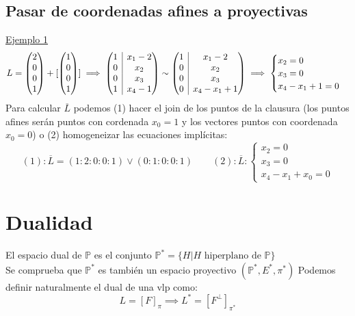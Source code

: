 \documentclass{myclass}
\renewcommand{\P}{\mathbb{P}}
\begin{document}
\subsection{Pasar de coordenadas afines a proyectivas}
\underline{Ejemplo 1} \\
\[
  L = \begin{pmatrix} 2 \\ 0\\0\\1 \end{pmatrix} + [\begin{pmatrix} 1\\0\\0\\1 \end{pmatrix} ] \implies \left(\begin{array}{@{}c|c@{}} 1 & x_1-2 \\ 0 & x_2 \\ 0 & x_3 \\ 1 & x_4-1 \end{array}  \right) \sim \left(\begin{array}{@{}c|c@{}} 1 & x_1-2 \\ 0 & x_2 \\ 0 & x_3 \\ 0 & x_4-x_1+1 \end{array} \right) \implies
  \begin{cases}
    x_2 = 0 \\
	x_3 = 0 \\
	x_4-x_1+1 = 0
  \end{cases}
\] 
Para calcular $\overline{L}$ podemos (1) hacer el join de los puntos de la clausura (los puntos afines serán puntos con cordenada $x_0=1$ y los vectores puntos con coordenada $x_0=0$) o (2) homogeneizar las ecuaciones implícitas:
 \[
   (1): \overline{L} = (1:2:0:0:1)\vee (0:1:0:0:1) \qquad (2): \overline{L}:\begin{cases}
     x_2=0\\
	 x_3=0\\
	 x_4-x_1+x_0=0
   \end{cases}
\] 

\section{Dualidad}
El espacio dual de $\P$ es el conjunto $\P^* = \{H | H \text{ hiperplano de }\P\}$ \\
Se comprueba que $\P^*$ es también un espacio proyectivo $(\P^*, E^*, \pi^*)$
Podemos definir naturalmente el dual de una vlp como:
$$
L = [F]_\pi \implies L^* = [F^\perp]_{\pi^*}
$$
\end{document}
